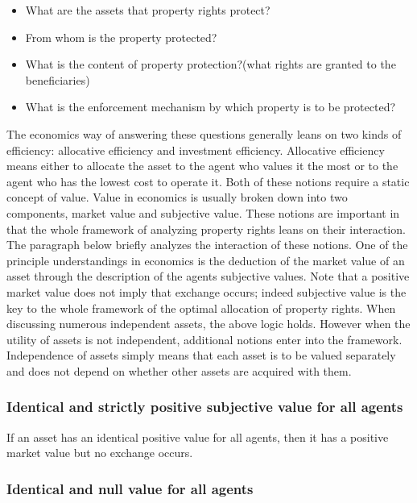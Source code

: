\begin{itemize}
  \item What are the assets that property rights protect?
  \item From whom is the property protected?
  \item What is the content of property protection?(what rights are granted to the beneficiaries)
  \item What is the enforcement mechanism by which property is to be protected?  
\end{itemize}

The economics way of answering these questions generally leans on two kinds of efficiency: allocative efficiency and investment efficiency. Allocative efficiency means either to allocate the asset to the agent who values it the most or to the agent who has the lowest cost to operate it. Both of these notions require a static concept of value. Value in economics is usually broken down into two components, market value and subjective value. These notions are important in that the whole framework of analyzing property rights leans on their interaction. The paragraph below briefly analyzes the interaction of these notions. One of the principle understandings in economics is the deduction of the market value of an asset through the description of the agents subjective values. Note that a positive market value does not imply that exchange occurs; indeed subjective value is the key to the whole framework of the optimal allocation of property rights. When discussing numerous independent assets, the above logic holds. However when the utility of assets is not independent, additional notions enter into the framework. Independence of assets simply means that each asset is to be valued separately and does not depend on whether other assets are acquired with them.


\subsubsection{Identical and strictly positive subjective value for all agents}

If an asset has an identical positive value for all agents, then it has a positive market value but no exchange occurs.

\subsubsection{Identical and null value for all agents}

